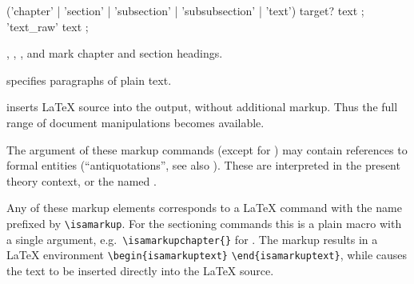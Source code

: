 \begin{isabellebody}
\begin{isamarkuptext}
  \begin{rail}
    ('chapter' | 'section' | 'subsection' | 'subsubsection' | 'text') target? text
    ;
    'text\_raw' text
    ;
  \end{rail}

  \begin{descr}

  \item [\hyperlink{command.chapter}{\mbox{\isa{\isacommand{chapter}}}}, \hyperlink{command.section}{\mbox{\isa{\isacommand{section}}}}, \hyperlink{command.subsection}{\mbox{\isa{\isacommand{subsection}}}}, and \hyperlink{command.subsubsection}{\mbox{\isa{\isacommand{subsubsection}}}}] mark chapter and
  section headings.

  \item [\hyperlink{command.text}{\mbox{\isa{\isacommand{text}}}}] specifies paragraphs of plain text.

  \item [\hyperlink{command.text-raw}{\mbox{\isa{\isacommand{text{\isacharunderscore}raw}}}}] inserts {\LaTeX} source into the
  output, without additional markup.  Thus the full range of document
  manipulations becomes available.

  \end{descr}

  The  argument of these markup commands (except for
  \hyperlink{command.text-raw}{\mbox{}}) may contain references to formal entities
  (``antiquotations'', see also ).  These are
  interpreted in the present theory context, or the named .

  Any of these markup elements corresponds to a {\LaTeX} command with
  the name prefixed by \verb|\isamarkup|.  For the sectioning
  commands this is a plain macro with a single argument, e.g.\
  \verb|\isamarkupchapter{|\isa{{\isachardoublequote}{\isasymdots}{\isachardoublequote}}\verb|}| for
  \hyperlink{command.chapter}{\mbox{\isa{\isacommand{chapter}}}}.  The \hyperlink{command.text}{\mbox{}} markup results in a
  {\LaTeX} environment \verb|\begin{isamarkuptext}| \isa{{\isachardoublequote}{\isasymdots}{\isachardoublequote}} \verb|\end{isamarkuptext}|, while \hyperlink{command.text-raw}{\mbox{}}
  causes the text to be inserted directly into the {\LaTeX} source.


\end{isamarkuptext}
\end{isabellebody}

